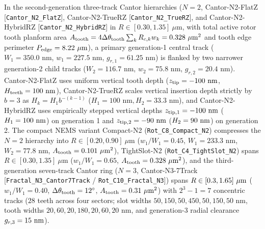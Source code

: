 \documentclass[pdflatex,sn-nature]{sn-jnl}
\DeclareRobustCommand{\roundtwo}[1]{\fpeval{round(#1,2)}}
\DeclareRobustCommand{\roundthree}[1]{\fpeval{round(#1,3)}}
\begin{document}
In the second-generation three-track Cantor hierarchies ($N=2$, Cantor-N2-FlatZ [\texttt{Cantor\_N2\_FlatZ}], Cantor-N2-TrueRZ [\texttt{Cantor\_N2\_TrueRZ}], and Cantor-N2-HybridRZ [\texttt{Cantor\_N2\_HybridRZ}] in $R \in [0.30, 1.35]\ \mu\text{m}$, with total active rotor tooth planform area $A_{\rm tooth} = 4\Delta\theta_{\rm tooth}\sum_k R_{c,k} w_k = \roundthree{\FractalCantorFlatzActiveToothAreaUmtwo}\ \mu\text{m}^2$ and tooth edge perimeter $P_{\rm edge} = \roundtwo{\FractalCantorFlatzEdgePerimeterUm}\ \mu\text{m}$), a primary generation-1 central track ($W_1 = 350.0\text{ nm}$, $w_1 = 227.5\text{ nm}$, $g_{r,1} = 61.25\text{ nm}$) is flanked by two narrower generation-2 child tracks ($W_2 = 116.7\text{ nm}$, $w_2 = 75.8\text{ nm}$, $g_{r,2} = 20.4\text{ nm}$). Cantor-N2-FlatZ uses uniform vertical tooth depth ($z_{\rm tip} = -100\text{ nm}$, $H_{\rm teeth} = 100\text{ nm}$), Cantor-N2-TrueRZ scales vertical insertion depth strictly by $b=3$ as $H_k = H_1 b^{-(k-1)}$ ($H_1 = 100\text{ nm}, H_2 = 33.3\text{ nm}$), and Cantor-N2-HybridRZ uses empirically stepped vertical depths $z_{\rm tip,1} = -100{}\text{ nm}$ ($H_1 = 100{}\text{ nm}$) on generation 1 and $z_{\rm tip,2} = -90{}\text{ nm}$ ($H_2 = 90{}\text{ nm}$) on generation 2. The compact NEMS variant Compact-N2 (\texttt{Rot\_C8\_Compact\_N2}) compresses the $N=2$ hierarchy into $R \in [0.20, 0.90]\ \mu\text{m}$ ($w_1/W_1 = 0.45$, $W_1 = 233.3\text{ nm}$, $W_2 = 77.8\text{ nm}$, $A_{\rm tooth} = \roundthree{\RotCeightCompactNtwoStandardThetaZerofoureightpzeroPolarOverlapUmtwo}\ \mu\text{m}^2$), TightSlot-N2 (\texttt{Rot\_C4\_TightSlot\_N2}) spans $R \in [0.30, 1.35]\ \mu\text{m}$ ($w_1/W_1 = 0.65$, $A_{\rm tooth} = \roundthree{\RotCfourTightslotNtwoHighThetaZerofoureightpzeroPolarOverlapUmtwo}\ \mu\text{m}^2$), and the third-generation seven-track Cantor ring ($N=3$, Cantor-N3-7Track [\texttt{Fractal\_N3\_Cantor7Track} / \texttt{Rot\_C10\_Fractal\_N3}]) spans $R \in [0.3{}, 1.65{}]\ \mu\text{m}$ ($w_1/W_1 = 0.40$, $\Delta\theta_{\rm tooth} = 12^\circ$, $A_{\rm tooth} = \roundthree{\RotConezeroFractalNthreeStandardThetaZerofoureightpzeroPolarOverlapUmtwo}\ \mu\text{m}^2$) with $2^3 - 1 = 7$ concentric tracks ($28$ teeth across four sectors; slot widths $50, 150, 50, 450, 50, 150, 50\text{ nm}$, tooth widths $20, 60, 20, 180, 20, 60, 20\text{ nm}$, and generation-3 radial clearance $g_{r,3} = 15{}\text{ nm}$).
\end{document}
